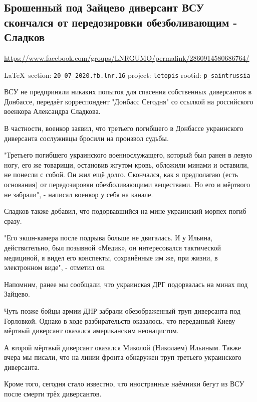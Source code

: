  
 

\subsection{Брошенный под Зайцево диверсант ВСУ скончался от передозировки обезболивающим - Сладков}
\url{https://www.facebook.com/groups/LNRGUMO/permalink/2860914580686764/}
  
\vspace{0.5cm}
{\small\LaTeX~section: \verb|20_07_2020.fb.lnr.16| project: \verb|letopis| rootid: \verb|p_saintrussia|}
\vspace{0.5cm}

ВСУ не предприняли никаких попыток для спасения собственных диверсантов в
Донбассе, передаёт корреспондент "Донбасс Сегодня" со ссылкой на российского
военкора Александра Сладкова.

В частности, военкор заявил, что третьего погибшего в Донбассе украинского
диверсанта сослуживцы бросили на произвол судьбы.

"Третьего погибшего украинского военнослужащего, который был ранен в левую
ногу, его же товарищи, остановив жгутом кровь, обложили минами и оставили, не
понесли с собой. Он жил ещё долго.  Скончался, как я предполагаю (есть
основания) от передозировки обезболивающими веществами. Но его и мёртвого не
забрали", - написал военкор у себя на канале.

Сладков также добавил, что подорвавшийся на мине украинский морпех погиб сразу.

"Его экшн-камера после подрыва больше не двигалась.  И у Ильина, действительно,
был позывной «Медик», он интересовался тактической медициной, я видел его
конспекты, сохранённые им же, при жизни, в электронном виде", - отметил он.

Напомним, ранее мы сообщали, что украинская ДРГ подорвалась на минах под
Зайцево.

Чуть позже бойцы армии ДНР забрали обезображенный труп диверсанта под
Горловкой. Однако в ходе разбирательств оказалось, что переданный Киеву мёртвый
диверсант оказался американским неонацистом.

А второй мёртвый диверсант оказался Миколой (Николаем) Ильиным.  Также вчера мы
писали, что на линии фронта обнаружен труп третьего украинского диверсанта.

Кроме того, сегодня стало известно, что иностранные наёмники бегут из ВСУ после
смерти трёх диверсантов. 
